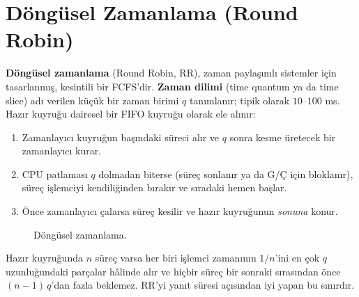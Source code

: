 \documentclass[11pt,a4paper]{article}
\newcommand{\term}[1]{\textbf{\color{mintdeep}#1}}
\begin{document}
\section{Döngüsel Zamanlama (Round Robin)}

\term{Döngüsel zamanlama} (Round Robin, RR), zaman paylaşımlı sistemler için tasarlanmış, kesintili bir FCFS'dir. \term{Zaman dilimi} (time quantum ya da time slice) adı verilen küçük bir zaman birimi $q$ tanımlanır; tipik olarak $10$--$100$ ms. Hazır kuyruğu dairesel bir FIFO kuyruğu olarak ele alınır:
\begin{enumerate}[leftmargin=1.4em]
  \item Zamanlayıcı kuyruğun başındaki süreci alır ve $q$ sonra kesme üretecek bir zamanlayıcı kurar.
  \item CPU patlaması $q$ dolmadan biterse (süreç sonlanır ya da G/Ç için bloklanır), süreç işlemciyi kendiliğinden bırakır ve sıradaki hemen başlar.
  \item Önce zamanlayıcı çalarsa süreç kesilir ve hazır kuyruğunun \emph{sonuna} konur.
\end{enumerate}

\begin{figure}[H]
\centering
{}
\caption{Döngüsel zamanlama.}
\end{figure}

Hazır kuyruğunda $n$ süreç varsa her biri işlemci zamanının $1/n$'ini en çok $q$ uzunluğundaki parçalar hâlinde alır ve hiçbir süreç bir sonraki sırasından önce $(n-1)\,q$'dan fazla beklemez. RR'yi yanıt süresi açısından iyi yapan bu sınırdır.
\end{document}

